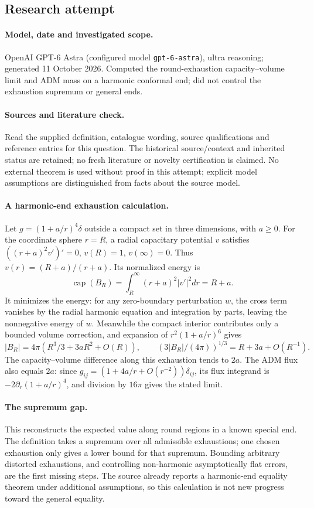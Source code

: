 \documentclass[11pt]{article}
\begin{document}
\subsection{Research attempt}
\paragraph{Model, date and investigated scope.}
OpenAI GPT-6 Astra (configured model \texttt{gpt-6-astra}), ultra reasoning; generated 11 October 2026. Computed the round-exhaustion capacity–volume limit and ADM mass on a harmonic conformal end; did not control the exhaustion supremum or general ends.

\paragraph{Sources and literature check.}
Read the supplied definition, catalogue wording, source qualifications and reference entries for this question. The historical source/context and inherited status are retained; no fresh literature or novelty certification is claimed. No external theorem is used without proof in this attempt; explicit model assumptions are distinguished from facts about the source model.

\paragraph{A harmonic-end exhaustion calculation.} Let \(g=(1+a/r)^4\delta\) outside a compact set in three dimensions, with \(a\ge0\). For the coordinate sphere \(r=R\), a radial capacitary potential \(v\) satisfies \(((r+a)^2v')'=0\), \(v(R)=1\), \(v(\infty)=0\). Thus \(v(r)=(R+a)/(r+a)\). Its normalized energy is
\[
 \operatorname{cap}(B_R)=\int_R^\infty(r+a)^2|v'|^2dr=R+a.
\]
It minimizes the energy: for any zero-boundary perturbation \(w\), the cross term vanishes by the radial harmonic equation and integration by parts, leaving the nonnegative energy of \(w\).
Meanwhile the compact interior contributes only a bounded volume correction, and expansion of \(r^2(1+a/r)^6\) gives
\[
 |B_R|=4\pi(R^3/3+3aR^2+O(R)),\qquad
 (3|B_R|/(4\pi))^{1/3}=R+3a+O(R^{-1}).
\]
The capacity--volume difference along this exhaustion tends to \(2a\). The ADM flux also equals \(2a\): since \(g_{ij}=(1+4a/r+O(r^{-2}))\delta_{ij}\), its flux integrand is \(-2\partial_r(1+a/r)^4\), and division by \(16\pi\) gives the stated limit.
\paragraph{The supremum gap.} This reconstructs the expected value along round regions in a known special end. The definition takes a supremum over all admissible exhaustions; one chosen exhaustion only gives a lower bound for that supremum. Bounding arbitrary distorted exhaustions, and controlling non-harmonic asymptotically flat errors, are the first missing steps. The source already reports a harmonic-end equality theorem under additional assumptions, so this calculation is not new progress toward the general equality.
\end{document}
